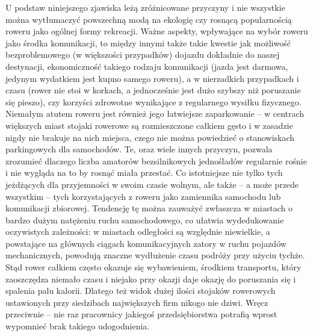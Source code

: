 U podstaw niniejszego zjawiska leżą zróżnicowane przyczyny i nie wszystkie można wytłumaczyć powszechną modą na ekologię czy rosnącą popularnością roweru jako ogólnej formy rekreacji. Ważne aspekty, wpływające na wybór roweru jako środka komunikacji, to między innymi także takie kwestie jak możliwość bezproblemowego (w większości przypadków) dojazdu dokładnie do naszej destynacji, ekonomiczność takiego rodzaju komunikacji (jazda jest darmowa, jedynym wydatkiem jest kupno samego roweru), a w nierzadkich przypadkach i czasu (rower nie stoi w korkach, a jednocześnie jest dużo szybszy niż poruszanie się pieszo), czy korzyści zdrowotne wynikające z regularnego wysiłku fizycznego. Niemałym atutem roweru jest również jego łatwiejsze zaparkowanie – w centrach większych miast stojaki rowerowe są rozmieszczone całkiem gęsto i w zasadzie nigdy nie brakuje na nich miejsca, czego nie można powiedzieć o stanowiskach parkingowych dla samochodów. Te, oraz wiele innych przyczyn, pozwala zrozumieć dlaczego liczba amatorów bezsilnikowych jednośladów regularnie rośnie i nie wygląda na to by rosnąć miała przestać. Co istotniejsze nie tylko tych jeżdżących dla przyjemności w swoim czasie wolnym, ale także – a może przede wszystkim – tych korzystających z roweru jako zamiennika samochodu lub komunikacji zbiorowej. Tendencję tę można zauważyć zwłaszcza w miastach o bardzo dużym natężeniu ruchu samochodowego, co ułatwia wydedukowanie oczywistych zależności: w miastach odległości są względnie niewielkie, a powstające na głównych ciągach komunikacyjnych zatory w ruchu pojazdów mechanicznych, powodują znaczne wydłużenie czasu podróży przy użyciu tychże. Stąd rower całkiem często okazuje się wybawieniem, środkiem transportu, który zaoszczędza niemało czasu i niejako przy okazji daje okazję do poruszania się i spalenia palu kalorii. Dlatego też widok dużej ilości stojaków rowerowych ustawionych przy siedzibach największych firm nikogo nie dziwi. Wręcz przeciwnie – nie raz pracownicy jakiegoś przedsiębiorstwa potrafią wprost wypomnieć brak takiego udogodnienia.  
